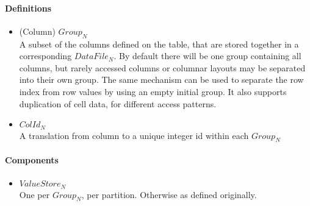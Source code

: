 \documentclass[fleqn]{article}
\begin{document}
\paragraph{Definitions}
\begin{itemize}
  \item (Column) $Group_N$\\[2pt]
    A subset of the columns defined on the table, that are stored together in a
    corresponding $DataFile_N$. By default there will be one group containing all columns, 
    but rarely accessed columns or columnar layouts may be separated into their own group.
    The same mechanism can be used to separate the row index from row values by using
    an empty initial group. It also supports duplication of cell data, for different access
    patterns.
  \item $ColId_N$\\[2pt]
    A translation from column to a unique integer id within each $Group_N$
    
\end{itemize}

\paragraph{Components}
\begin{itemize}
  \item $ValueStore_N$\\[2pt]
    One per $Group_N$, per partition. Otherwise as defined originally.
\end{itemize}
\end{document}

